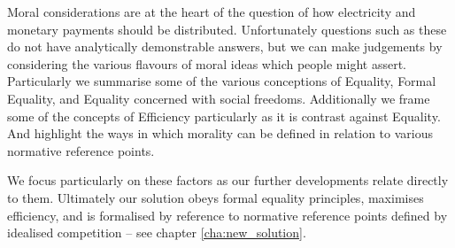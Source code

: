 Moral considerations are at the heart of the question of how electricity and monetary payments should be distributed.
Unfortunately questions such as these do not have analytically demonstrable answers, but we can make judgements by considering the various flavours of moral ideas which people might assert.
Particularly we summarise some of the various conceptions of Equality, Formal Equality, and Equality concerned with social freedoms.
Additionally we frame some of the concepts of Efficiency particularly as it is contrast against Equality.
And highlight the ways in which morality can be defined in relation to various normative reference points\DIFaddbegin {}\DIFaddend .

We focus particularly on these factors as our further developments relate directly to them.
Ultimately our solution obeys formal equality principles, maximises efficiency, and is formalised by reference to normative reference points defined by idealised competition -- see chapter \ref{cha:new_solution}.




